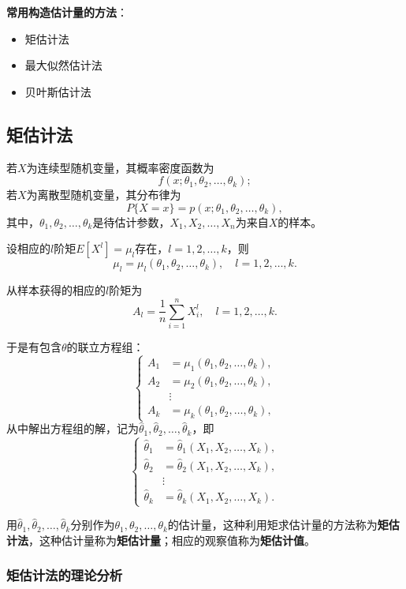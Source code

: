 \documentclass[11pt,a4paper]{report}
\theoremstyle{definition}
\begin{document}
\textbf{常用构造估计量的方法}：
\begin{itemize}[leftmargin=2em]
    \item 矩估计法
    \item 最大似然估计法
    \item 贝叶斯估计法
\end{itemize}

\subsection{矩估计法}

若$X$为连续型随机变量，其概率密度函数为
\[
f(x;\theta_{1},\theta_{2},\ldots,\theta_{k});
\]
若$X$为离散型随机变量，其分布律为
\[
P\{X=x\}=p(x;\theta_{1},\theta_{2},\ldots,\theta_{k}),
\]
其中，$\theta_{1},\theta_{2},\ldots,\theta_{k}$是待估计参数，$X_{1},X_{2},\ldots,X_{n}$为来自$X$的样本。

设相应的$l$阶矩$E[X^{l}]=\mu_{l}$存在，$l=1,2,\ldots,k$，则
\[
\mu_{l}=\mu_{l}(\theta_{1},\theta_{2},\ldots,\theta_{k}),\quad l=1,2,\ldots,k.
\]

从样本获得的相应的$l$阶矩为
\[
A_{l}=\frac{1}{n}\sum_{i=1}^{n}X_{i}^{l},\quad l=1,2,\ldots,k.
\]

于是有包含$\theta$的联立方程组：
\[
\left\{
\begin{aligned}
A_{1}&=\mu_{1}(\theta_{1},\theta_{2},\ldots,\theta_{k}),\\
A_{2}&=\mu_{2}(\theta_{1},\theta_{2},\ldots,\theta_{k}),\\
&\vdots\\
A_{k}&=\mu_{k}(\theta_{1},\theta_{2},\ldots,\theta_{k}),
\end{aligned}
\right.
\]
从中解出方程组的解，记为$\hat{\theta}_{1},\hat{\theta}_{2},\ldots,\hat{\theta}_{k}$，即
\[
\left\{
\begin{aligned}
\hat{\theta}_{1}&=\hat{\theta}_{1}(X_{1},X_{2},\ldots,X_{k}),\\
\hat{\theta}_{2}&=\hat{\theta}_{2}(X_{1},X_{2},\ldots,X_{k}),\\
&\vdots\\
\hat{\theta}_{k}&=\hat{\theta}_{k}(X_{1},X_{2},\ldots,X_{k}).
\end{aligned}
\right.
\]

用$\hat{\theta}_{1},\hat{\theta}_{2},\ldots,\hat{\theta}_{k}$分别作为$\theta_{1},\theta_{2},\ldots,\theta_{k}$的估计量，这种利用矩求估计量的方法称为\textbf{矩估计法}，这种估计量称为\textbf{矩估计量}；相应的观察值称为\textbf{矩估计值}。

\subsubsection*{矩估计法的理论分析}
\end{document}
